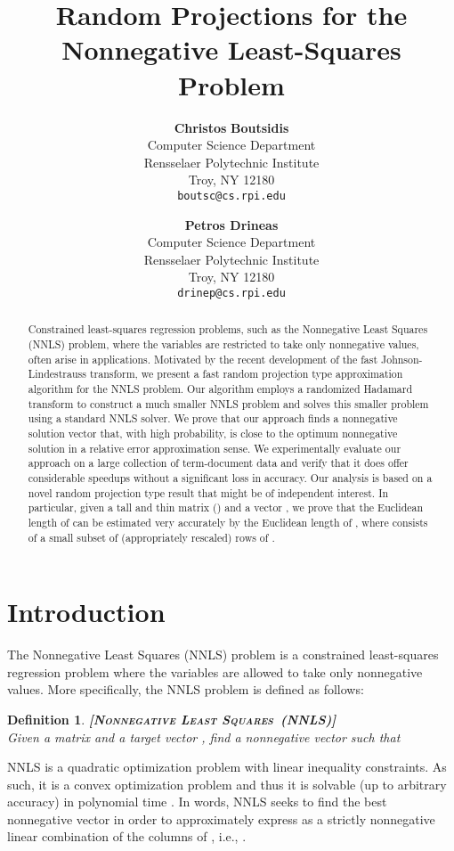 \documentclass[11pt]{article}
\title{\textbf{Random Projections for the Nonnegative Least-Squares Problem}}
\author{
\textbf{Christos }\textbf{Boutsidis}\\
Computer Science Department\\
Rensselaer Polytechnic Institute\\
Troy, NY 12180 \\
\texttt{boutsc@cs.rpi.edu} \\
\and
\textbf{Petros Drineas}\\
Computer Science Department\\
Rensselaer Polytechnic Institute\\
Troy, NY 12180 \\
\texttt{drinep@cs.rpi.edu} \\
}
\newtheorem{definition}{Definition}
\begin{document}
\maketitle

\begin{abstract}
Constrained least-squares regression problems, such as the
Nonnegative Least Squares (NNLS) problem, where the variables are
restricted to take only nonnegative values, often arise in
applications. Motivated by the recent development of the fast
Johnson-Lindestrauss transform, we present a fast random
projection type approximation algorithm for the NNLS problem. Our
algorithm employs a randomized Hadamard transform to construct a
much smaller NNLS problem and solves this smaller problem using a
standard NNLS solver. We prove that our approach finds a
nonnegative solution vector that, with high probability, is close
to the optimum nonnegative solution in a relative error
approximation sense. We experimentally evaluate our approach on a
large collection of term-document data and verify that it does
offer considerable speedups without a significant loss in
accuracy. Our analysis is based on a novel random projection type
result that might be of independent interest. In particular, given
a tall and thin matrix  ()  and a vector , we prove that the
Euclidean length of  can be estimated very accurately by
the Euclidean length of , where 
consists of a small subset of (appropriately rescaled) rows of
.
\end{abstract}

\section{Introduction}
The Nonnegative Least Squares (NNLS) problem is a constrained
least-squares regression problem where the variables are allowed
to take only nonnegative values. More specifically, the NNLS
problem is defined as follows:
\begin{definition} \label{def:NNLS}
\textbf{\textsc{[Nonnegative Least Squares~(NNLS)]}}\\
Given a matrix  and a target vector
, find a nonnegative vector  such that

\end{definition}
NNLS is a quadratic optimization problem with linear inequality
constraints. As such, it is a convex optimization problem and thus
it is solvable (up to arbitrary accuracy) in polynomial time
\cite{Bjo96}. In words, NNLS seeks to find the best nonnegative
vector  in order to approximately express  as a
strictly nonnegative linear combination of the columns of ,
i.e., .
\end{document}
